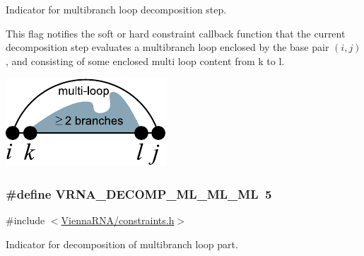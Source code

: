 Indicator for multibranch loop decomposition step. 

This flag notifies the soft or hard constraint callback function that the current decomposition step evaluates a multibranch loop enclosed by the base pair $(i,j)$, and consisting of some enclosed multi loop content from k to l.

 
\begin{DoxyImageNoCaption}
  \mbox{\includegraphics[width=\textwidth,height=\textheight/2,keepaspectratio=true]{decomp_ml}}
\end{DoxyImageNoCaption}
\subsubsection[{\texorpdfstring{V\+R\+N\+A\+\_\+\+D\+E\+C\+O\+M\+P\+\_\+\+M\+L\+\_\+\+M\+L\+\_\+\+ML}{VRNA_DECOMP_ML_ML_ML}}]{\setlength{\rightskip}{0pt plus 5cm}\#define V\+R\+N\+A\+\_\+\+D\+E\+C\+O\+M\+P\+\_\+\+M\+L\+\_\+\+M\+L\+\_\+\+ML~5}\hypertarget{group__constraints_ga735517266f2e35e1374b8f1ea77ef23e}{}\label{group__constraints_ga735517266f2e35e1374b8f1ea77ef23e}


{\ttfamily \#include $<$\hyperlink{constraints_8h}{Vienna\+R\+N\+A/constraints.\+h}$>$}



Indicator for decomposition of multibranch loop part. 

